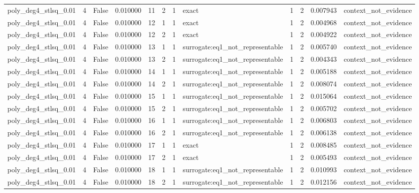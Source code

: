 \begin{tabular}{lrrrrrrlrrrl}
poly\_deg4\_stlsq\_0.01 & 4 & False & 0.010000 & 11 & 2 & 1 & exact & 1 & 2 & 0.007943 & context\_not\_evidence \\
poly\_deg4\_stlsq\_0.01 & 4 & False & 0.010000 & 12 & 1 & 1 & exact & 1 & 2 & 0.004968 & context\_not\_evidence \\
poly\_deg4\_stlsq\_0.01 & 4 & False & 0.010000 & 12 & 2 & 1 & exact & 1 & 2 & 0.004922 & context\_not\_evidence \\
poly\_deg4\_stlsq\_0.01 & 4 & False & 0.010000 & 13 & 1 & 1 & surrogate:eq1\_not\_representable & 1 & 2 & 0.005740 & context\_not\_evidence \\
poly\_deg4\_stlsq\_0.01 & 4 & False & 0.010000 & 13 & 2 & 1 & surrogate:eq1\_not\_representable & 1 & 2 & 0.004343 & context\_not\_evidence \\
poly\_deg4\_stlsq\_0.01 & 4 & False & 0.010000 & 14 & 1 & 1 & surrogate:eq1\_not\_representable & 1 & 2 & 0.005188 & context\_not\_evidence \\
poly\_deg4\_stlsq\_0.01 & 4 & False & 0.010000 & 14 & 2 & 1 & surrogate:eq1\_not\_representable & 1 & 2 & 0.008074 & context\_not\_evidence \\
poly\_deg4\_stlsq\_0.01 & 4 & False & 0.010000 & 15 & 1 & 1 & surrogate:eq1\_not\_representable & 1 & 2 & 0.015064 & context\_not\_evidence \\
poly\_deg4\_stlsq\_0.01 & 4 & False & 0.010000 & 15 & 2 & 1 & surrogate:eq1\_not\_representable & 1 & 2 & 0.005702 & context\_not\_evidence \\
poly\_deg4\_stlsq\_0.01 & 4 & False & 0.010000 & 16 & 1 & 1 & surrogate:eq1\_not\_representable & 1 & 2 & 0.006803 & context\_not\_evidence \\
poly\_deg4\_stlsq\_0.01 & 4 & False & 0.010000 & 16 & 2 & 1 & surrogate:eq1\_not\_representable & 1 & 2 & 0.006138 & context\_not\_evidence \\
poly\_deg4\_stlsq\_0.01 & 4 & False & 0.010000 & 17 & 1 & 1 & exact & 1 & 2 & 0.008485 & context\_not\_evidence \\
poly\_deg4\_stlsq\_0.01 & 4 & False & 0.010000 & 17 & 2 & 1 & exact & 1 & 2 & 0.005493 & context\_not\_evidence \\
poly\_deg4\_stlsq\_0.01 & 4 & False & 0.010000 & 18 & 1 & 1 & surrogate:eq1\_not\_representable & 1 & 2 & 0.010993 & context\_not\_evidence \\
poly\_deg4\_stlsq\_0.01 & 4 & False & 0.010000 & 18 & 2 & 1 & surrogate:eq1\_not\_representable & 1 & 2 & 0.012156 & context\_not\_evidence \\

\end{tabular}
